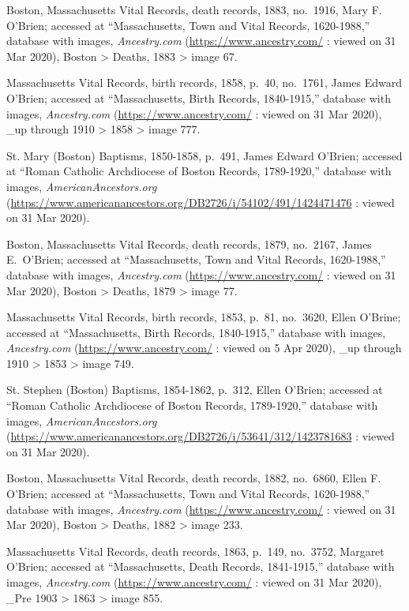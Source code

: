 \begin{thebibliography}{999}
	Boston, Massachusetts Vital Records, death records, 1883, no.\ 1916, Mary F. O'Brien; accessed at ``Massachusetts, Town and Vital Records, 1620-1988,'' database with images, \textit{Ancestry.com} (\url{https://www.ancestry.com/} : viewed on 31 Mar 2020), Boston > Deaths, 1883 > image 67.
	
	Massachusetts Vital Records, birth records, 1858, p.\ 40, no.\ 1761, James Edward O'Brien; accessed at ``Massachusetts, Birth Records, 1840-1915,'' database with images, \textit{Ancestry.com} (\url{https://www.ancestry.com/} : viewed on 31 Mar 2020), \_up through 1910 > 1858 > image 777.
	
	St. Mary (Boston) Baptisms, 1850-1858, p.\ 491, James Edward O'Brien; accessed at ``Roman Catholic Archdiocese of Boston Records, 1789-1920,'' database with images, \textit{AmericanAncestors.org} (\url{https://www.americanancestors.org/DB2726/i/54102/491/1424471476} : viewed on 31 Mar 2020).
	
	Boston, Massachusetts Vital Records, death records, 1879, no.\ 2167, James E.\ O'Brien; accessed at ``Massachusetts, Town and Vital Records, 1620-1988,'' database with images, \textit{Ancestry.com} (\url{https://www.ancestry.com/} : viewed on 31 Mar 2020), Boston > Deaths, 1879 > image 77.
	
	Massachusetts Vital Records, birth records, 1853, p.\ 81, no.\ 3620, Ellen O'Brine; accessed at ``Massachusetts, Birth Records, 1840-1915,'' database with images, \textit{Ancestry.com} (\url{https://www.ancestry.com/} : viewed on 5 Apr 2020), \_up through 1910 > 1853 > image 749.
	
	St. Stephen (Boston) Baptisms, 1854-1862, p.\ 312, Ellen O'Brien; accessed at ``Roman Catholic Archdiocese of Boston Records, 1789-1920,'' database with images, \textit{AmericanAncestors.org} (\url{https://www.americanancestors.org/DB2726/i/53641/312/1423781683} : viewed on 31 Mar 2020).
	
	Boston, Massachusetts Vital Records, death records, 1882, no.\ 6860, Ellen F. O'Brien; accessed at ``Massachusetts, Town and Vital Records, 1620-1988,'' database with images, \textit{Ancestry.com} (\url{https://www.ancestry.com/} : viewed on 31 Mar 2020), Boston > Deaths, 1882 > image 233.
	
	Massachusetts Vital Records, death records, 1863, p.\ 149, no.\ 3752, Margaret O'Brien; accessed at ``Massachusetts, Death Records, 1841-1915,'' database with images, \textit{Ancestry.com} (\url{https://www.ancestry.com/} : viewed on 31 Mar 2020), \_Pre 1903 > 1863 > image 855.
	

\end{thebibliography}
